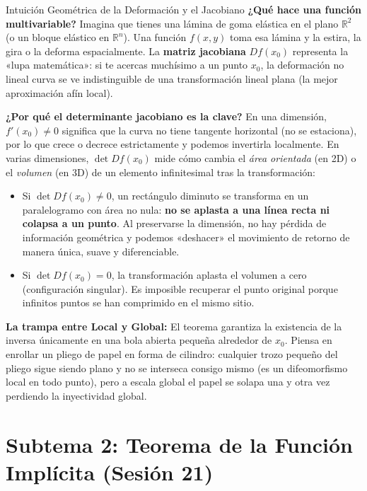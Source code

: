 \documentclass[11pt,a4paper]{article}
\begin{document}
\begin{intuitionbox}{Intuición Geométrica de la Deformación y el Jacobiano}
\textbf{¿Qué hace una función multivariable?} Imagina que tienes una lámina de goma elástica en el plano $\mathbb{R}^2$ (o un bloque elástico en $\mathbb{R}^n$). Una función $f(x,y)$ toma esa lámina y la estira, la gira o la deforma espacialmente. La \textbf{matriz jacobiana} $Df(x_0)$ representa la «lupa matemática»: si te acercas muchísimo a un punto $x_0$, la deformación no lineal curva se ve indistinguible de una transformación lineal plana (la mejor aproximación afín local).

\textbf{¿Por qué el determinante jacobiano es la clave?} En una dimensión, $f'(x_0) \neq 0$ significa que la curva no tiene tangente horizontal (no se estaciona), por lo que crece o decrece estrictamente y podemos invertirla localmente. En varias dimensiones, $\det Df(x_0)$ mide cómo cambia el \textit{área orientada} (en 2D) o el \textit{volumen} (en 3D) de un elemento infinitesimal tras la transformación:
\begin{itemize}[noitemsep]
    \item Si $\det Df(x_0) \neq 0$, un rectángulo diminuto se transforma en un paralelogramo con área no nula: \textbf{no se aplasta a una línea recta ni colapsa a un punto}. Al preservarse la dimensión, no hay pérdida de información geométrica y podemos «deshacer» el movimiento de retorno de manera única, suave y diferenciable.
    \item Si $\det Df(x_0) = 0$, la transformación aplasta el volumen a cero (configuración singular). Es imposible recuperar el punto original porque infinitos puntos se han comprimido en el mismo sitio.
\end{itemize}

\textbf{La trampa entre Local y Global:} El teorema garantiza la existencia de la inversa únicamente en una bola abierta pequeña alrededor de $x_0$. Piensa en enrollar un pliego de papel en forma de cilindro: cualquier trozo pequeño del pliego sigue siendo plano y no se interseca consigo mismo (es un difeomorfismo local en todo punto), pero a escala global el papel se solapa una y otra vez perdiendo la inyectividad global.
\end{intuitionbox}

\section{Subtema 2: Teorema de la Función Implícita (Sesión 21)}
\end{document}
